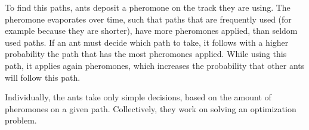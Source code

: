 To find this paths, ants deposit a pheromone on the track they are using. The pheromone evaporates over time, such that paths that are frequently used (for example because they are shorter), have more pheromones applied, than seldom used paths. If an ant must decide which path to take, it follows with a higher probability the path that has the most pheromones applied. While using this path, it applies again pheromones, which increases the probability that other ants will follow this path.

Individually, the ants take only simple decisions, based on the amount of pheromones on a given path. Collectively, they work on solving an optimization problem.